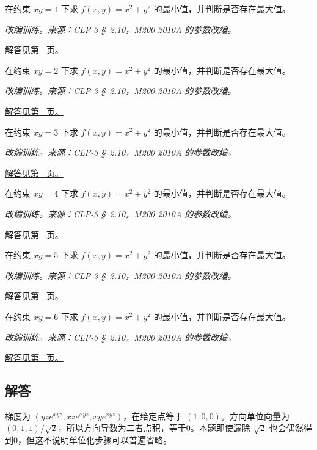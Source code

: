 \documentclass[UTF8,12pt,a4paper,fontset=fandol]{ctexart}
\begin{document}
\begin{example}[双曲线上的约束最值]\label{ex:c34q20}
在约束 $xy=1$ 下求 $f(x,y)=x^2+y^2$ 的最小值，并判断是否存在最大值。
\par\textit{改编训练。来源：CLP-3 \S~2.10，M200 2010A 的参数改编。}\par\hyperref[ans:c34q20]{解答见第~\pageref{ans:c34q20} 页。}
\end{example}
\begin{example}[双曲线上的约束最值]\label{ex:c34q21}
在约束 $xy=2$ 下求 $f(x,y)=x^2+y^2$ 的最小值，并判断是否存在最大值。
\par\textit{改编训练。来源：CLP-3 \S~2.10，M200 2010A 的参数改编。}\par\hyperref[ans:c34q21]{解答见第~\pageref{ans:c34q21} 页。}
\end{example}
\begin{example}[双曲线上的约束最值]\label{ex:c34q22}
在约束 $xy=3$ 下求 $f(x,y)=x^2+y^2$ 的最小值，并判断是否存在最大值。
\par\textit{改编训练。来源：CLP-3 \S~2.10，M200 2010A 的参数改编。}\par\hyperref[ans:c34q22]{解答见第~\pageref{ans:c34q22} 页。}
\end{example}
\begin{example}[双曲线上的约束最值]\label{ex:c34q23}
在约束 $xy=4$ 下求 $f(x,y)=x^2+y^2$ 的最小值，并判断是否存在最大值。
\par\textit{改编训练。来源：CLP-3 \S~2.10，M200 2010A 的参数改编。}\par\hyperref[ans:c34q23]{解答见第~\pageref{ans:c34q23} 页。}
\end{example}
\begin{example}[双曲线上的约束最值]\label{ex:c34q24}
在约束 $xy=5$ 下求 $f(x,y)=x^2+y^2$ 的最小值，并判断是否存在最大值。
\par\textit{改编训练。来源：CLP-3 \S~2.10，M200 2010A 的参数改编。}\par\hyperref[ans:c34q24]{解答见第~\pageref{ans:c34q24} 页。}
\end{example}
\begin{example}[双曲线上的约束最值]\label{ex:c34q25}
在约束 $xy=6$ 下求 $f(x,y)=x^2+y^2$ 的最小值，并判断是否存在最大值。
\par\textit{改编训练。来源：CLP-3 \S~2.10，M200 2010A 的参数改编。}\par\hyperref[ans:c34q25]{解答见第~\pageref{ans:c34q25} 页。}
\end{example}
\subsection{解答}
\begin{solve}\label{ans:c34q1}
梯度为 $(yze^{xyz},xze^{xyz},xye^{xyz})$，在给定点等于 $(1,0,0)$。方向单位向量为 $(0,1,1)/\sqrt2$，所以方向导数为二者点积，等于0。本题即使漏除 $\sqrt2$ 也会偶然得到0，但这不说明单位化步骤可以普遍省略。
\end{solve}
\end{document}
